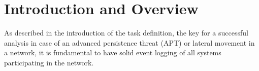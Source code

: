 \section{Introduction and Overview}
As described in the introduction of the task definition, the key for a successful analysis in case of an advanced persistence threat (APT) or lateral movement in a network, it is fundamental to have solid event logging of all systems participating in the network.

